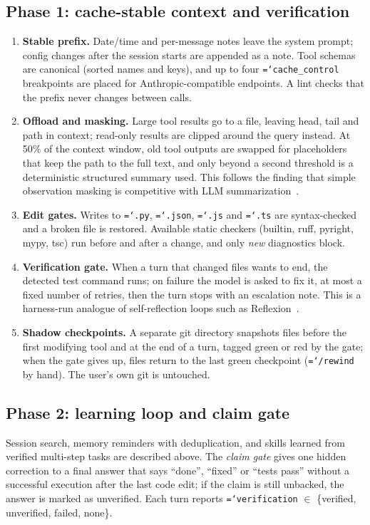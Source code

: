 \documentclass[11pt]{article}
\newcommand{\code}[1]{\texttt{\hyphenchar\font=`\-\relax #1}}
\begin{document}
\subsection{Phase 1: cache-stable context and verification}
\begin{enumerate}[label=\arabic*.]
\item \textbf{Stable prefix.} Date/time and per-message notes leave the system prompt; config changes after the session starts are appended as a note. Tool schemas
  are canonical (sorted names and keys), and up to four \code{cache\_control} breakpoints are placed for Anthropic-compatible endpoints. A lint checks that the prefix never changes between calls.
\item \textbf{Offload and masking.} Large tool results go to a file, leaving head, tail and path in context; read-only results are clipped around the query instead.
  At 50\% of the context window, old tool outputs are swapped for placeholders that keep the path to the full text, and only beyond a second threshold is a deterministic
  structured summary used. This follows the finding that simple observation masking is competitive with LLM summarization~\citep{lindenbauer2025complexity}.
\item \textbf{Edit gates.} Writes to \code{.py}, \code{.json}, \code{.js} and \code{.ts} are syntax-checked and a broken file is restored. Available static checkers (builtin, ruff, pyright, mypy, tsc)
  run before and after a change, and only \emph{new} diagnostics block.
\item \textbf{Verification gate.} When a turn that changed files wants to end, the detected test command runs; on failure the model is asked to fix it, at most a fixed number of retries, then the turn stops with an escalation note.
  This is a harness-run analogue of self-reflection loops such as Reflexion~\citep{shinn2023reflexion}.
\item \textbf{Shadow checkpoints.} A separate git directory snapshots files before the first modifying tool and at the end of a turn, tagged green or red by the gate; when the gate gives up, files return to the last green checkpoint (\code{/rewind} by hand). The user's own git is untouched.
\end{enumerate}

\subsection{Phase 2: learning loop and claim gate}
Session search, memory reminders with deduplication, and skills learned from verified multi-step tasks are described above. The \emph{claim gate} gives one hidden
correction to a final answer that says ``done'', ``fixed'' or ``tests pass'' without a successful execution after the last code edit; if the claim is still unbacked, the answer is marked
as unverified. Each turn reports \code{verification} $\in$ \{verified, unverified, failed, none\}.
\end{document}
